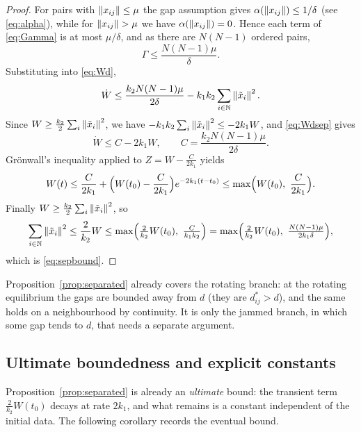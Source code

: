 \begin{proof}
For pairs with $\left\| x_{ij} \right\|\le\mu$ the gap assumption gives
$\alpha(\left\| x_{ij} \right\|)\le1/\delta$ (see \eqref{eq:alpha}), while for $\norm{x_{ij}}>\mu$ we have
$\alpha(\left\| x_{ij} \right\|)=0$. Hence each term of \eqref{eq:Gamma} is at most $\mu/\delta$, and as there
are $N(N-1)$ ordered pairs,
\begin{equation}
  \Gamma\le \frac{N(N-1)\mu}{\delta} .
\end{equation}
Substituting into \eqref{eq:Wd},
\begin{equation}
  \dot W\le \frac{k_2 N(N-1)\mu}{2\delta}-k_1k_2\sum_{i\in\mathbb{N}}\left\| \tilde{x}_i \right\|^2 .
  \label{eq:Wdsep}
\end{equation}
Since $W\ge\frac{k_2}{2}\sum_i\left\| \tilde{x}_i \right\|^2$, we have
$-k_1k_2\sum_i\left\| \tilde{x}_i \right\|^2\le-2k_1W$, and \eqref{eq:Wdsep} gives
\begin{equation}
  \dot W\le C-2k_1W,\qquad C=\frac{k_2 N(N-1)\mu}{2\delta} .
  \label{eq:WdGron}
\end{equation}
Gr\"onwall's inequality applied to $Z=W-\frac{C}{2k_1}$ yields
\begin{equation}
  W(t)\le \frac{C}{2k_1}+\Bigl(W(t_0)-\frac{C}{2k_1}\Bigr)e^{-2k_1(t-t_0)}
       \le \max\Bigl(W(t_0),\ \frac{C}{2k_1}\Bigr) .
\end{equation}
Finally $W\ge\frac{k_2}{2}\sum_i\left\| \tilde{x}_i \right\|^2$, so
\begin{equation}
  \sum_{i\in\mathbb{N}}\left\| \tilde{x}_i \right\|^2\le\frac{2}{k_2}W
  \le\max\Bigl(\tfrac{2}{k_2}W(t_0),\ \tfrac{C}{k_1k_2}\Bigr)
   =\max\Bigl(\tfrac{2}{k_2}W(t_0),\ \tfrac{N(N-1)\mu}{2k_1\delta}\Bigr) ,
\end{equation}
which is \eqref{eq:sepbound}.
\end{proof}

Proposition~\ref{prop:separated} already covers the rotating branch: at the rotating equilibrium the
gaps are bounded away from $d$ (they are $d_{ij}^*>d$), and the same holds on a neighbourhood by
continuity. It is only the jammed branch, in which some gap tends to $d$, that needs a separate
argument.

\subsection{Ultimate boundedness and explicit constants}
\label{sec:ultimate}

Proposition~\ref{prop:separated} is already an \emph{ultimate} bound: the transient term
$\tfrac{2}{k_2}W(t_0)$ decays at rate $2k_1$, and what remains is a constant independent of the
initial data. The following corollary records the eventual bound.

